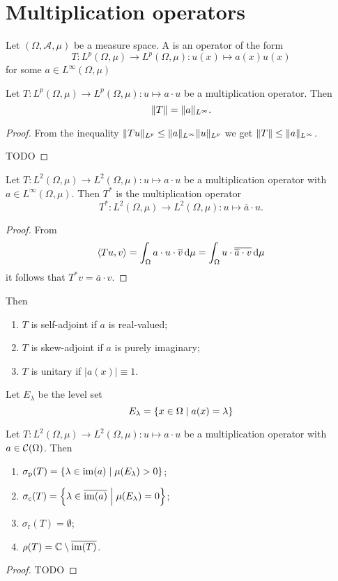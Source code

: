\section{Multiplication operators}
\begin{definition}
Let $(\Omega, \mathcal{A}, \mu)$ be a measure space. A  is an operator of the form
\[ T: L^p(\Omega, \mu) \to L^p(\Omega, \mu): u(x) \mapsto a(x)u(x) \]
for some $a\in L^\infty(\Omega,\mu)$
\end{definition}

\begin{proposition}
Let $T: L^p(\Omega, \mu) \to L^p(\Omega, \mu): u \mapsto a\cdot u$ be a multiplication operator. Then
\[ \lVert T\rVert = \lVert a\rVert_{L^\infty}. \]
\end{proposition}
\begin{proof}
From the inequality $\lVert Tu\rVert_{L^p}\leq \lVert a\rVert_{L^\infty}\lVert u\rVert_{L^p}$ we get $\lVert T\rVert \leq \lVert a\rVert_{L^\infty}$.

TODO
\end{proof}

\begin{lemma}
Let $T: L^2(\Omega, \mu) \to L^2(\Omega, \mu): u \mapsto a\cdot u$ be a multiplication operator with $a\in L^\infty(\Omega,\mu)$. Then $T^*$ is the multiplication operator
\[ T^*: L^2(\Omega, \mu) \to L^2(\Omega, \mu): u \mapsto \overline{a}\cdot u. \]
\end{lemma}
\begin{proof}
From 
\[ \left\langle Tu,v \right\rangle = \int_\Omega a\cdot u \cdot \overline{v}\operatorname{d \!}{\mu} = \int_\Omega u \cdot \overline{\overline{a}\cdot v}\operatorname{d \!}{\mu} \]
it follows that $T^*v = \overline{a}\cdot v$.
\end{proof}
\begin{corollary}
Then
\begin{enumerate}
\item $T$ is self-adjoint if $a$ is real-valued;
\item $T$ is skew-adjoint if $a$ is purely imaginary;
\item $T$ is unitary if $|a(x)| \equiv 1$.
\end{enumerate}
\end{corollary}

Let $E_\lambda$ be the level set
\[ E_\lambda = \left\{ x\in\Omega \;\middle|\; a(x) = \lambda \right\} \]

\begin{proposition}
Let $T: L^2(\Omega, \mu) \to L^2(\Omega, \mu): u\mapsto a\cdot u$ be a multiplication operator with $a\in \mathcal{C}(\Omega)$. Then
\begin{enumerate}
\item $\sigma_\text{p}(T) = \left\{ \lambda\in \operatorname{im}(a) \;\middle|\; \mu(E_\lambda)>0 \right\}$;
\item $\sigma_\text{c}(T) = \left\{ \lambda\in \overline{\operatorname{im}(a)} \;\middle|\; \mu(E_\lambda) = 0 \right\}$;
\item $\sigma_\text{r}(T) = \emptyset$;
\item $\rho(T) = \mathbb{C}\setminus \overline{\operatorname{im}(T)}$.
\end{enumerate}
\end{proposition}
\begin{proof}
TODO
\end{proof}

